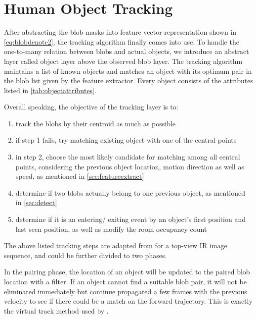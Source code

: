 \section{Human Object Tracking} \label{sec:track}
After abstracting the blob masks into feature vector representation shown in \autoref{eq:blobdenote2}, the tracking algorithm finally comes into use. To handle the one-to-many relation between blobs and actual objects, we introduce an abstract layer called object layer above the observed blob layer. The tracking algorithm maintains a list of known objects and matches an object with its optimum pair in the blob list given by the feature extractor. Every object consists of the attributes listed in \autoref{tab:objectattributes}.

 Overall speaking, the objective of the tracking layer is to:
\begin{enumerate}
  \item track the blobs by their centroid as much as possible
  \item if step 1 fails, try matching existing object with one of the central points
  \item in step 2, choose the most likely candidate for matching among all central points, considering the previous object location, motion direction as well as speed, as mentioned in \autoref{sec:featureextract}
  \item determine if two blobs actually belong to one previous object, as mentioned in \autoref{sec:detect}
  \item determine if it is an entering/ exiting event by an object's first position and last seen position, as well as modify the room occupancy count
\end{enumerate}

The above listed tracking steps are adapted from \cite{sharma2012blob} for a top-view IR image sequence, and could be further divided to two phases.

In the pairing phase, the location of an object will be updated to the paired blob location with a filter. If an object cannot find a suitable blob pair, it will not be eliminated immediately but continue propagated a few frames with the previous velocity to see if there could be a match on the forward trajectory. This is exactly the virtual track method used by \cite{virtualtrack}.

